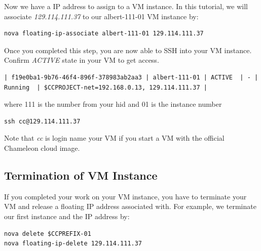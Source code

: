 Now we have a IP address to assign to a VM instance. In this tutorial,
we will associate \textit{129.114.111.37} to our
albert-111-01 VM instance by:

\begin{lstlisting}
nova floating-ip-associate albert-111-01 129.114.111.37
\end{lstlisting}

Once you completed this step, you are now able to SSH into your VM
instance.  Confirm \textit{ACTIVE} state in your VM to get access.

\begin{tiny}
\begin{lstlisting}
| f19e0ba1-9b76-46f4-896f-378983ab2aa3 | albert-111-01 | ACTIVE  | - | Running  | $CCPROJECT-net=192.168.0.13, 129.114.111.37 |
\end{lstlisting}
\end{tiny}

where 111 is the number from your hid and 01 is the instance number

\begin{lstlisting}
ssh cc@129.114.111.37
\end{lstlisting}

Note that \textit{cc} is login name your VM if you start a VM
with the official Chameleon cloud image.

\subsection{Termination of VM Instance}

If you completed your work on your VM instance, you have to terminate
your VM and release a floating IP address associated with. For
example, we terminate our first instance and the IP address by:

\begin{lstlisting}
nova delete $CCPREFIX-01
nova floating-ip-delete 129.114.111.37
\end{lstlisting}

